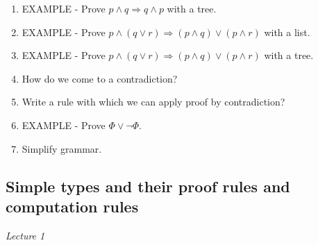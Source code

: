 \documentclass[fleqn]{article}
\begin{document}
\begin{enumerate}
    \item EXAMPLE \-- Prove $p \wedge q \Rightarrow q \wedge p$ with a tree.
    \item EXAMPLE \-- Prove $p \wedge (q \vee r) \Rightarrow (p \wedge q) \vee (p \wedge r)$ with a list.
    \item EXAMPLE \-- Prove $p \wedge (q \vee r) \Rightarrow (p \wedge q) \vee (p \wedge r)$ with a tree.
    \item How do we come to a contradiction?
    \item Write a rule with which we can apply proof by contradiction?
    \item EXAMPLE \-- Prove $\Phi \vee \neg \Phi$.
    \item Simplify grammar.
\end{enumerate}

\subsection{Simple types and their proof rules and computation rules}
\textit{Lecture 1}
\end{document}

